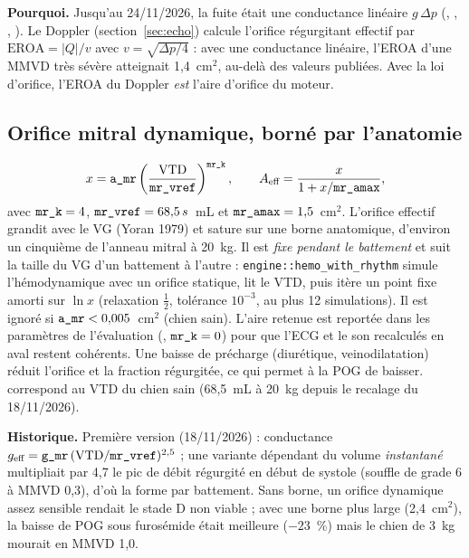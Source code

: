 \documentclass[10pt,a4paper]{article}
\newcommand{\cmd}[1]{\texttt{#1}}
\newcommand{\vp}[1]{\text{\texttt{\detokenize{#1}}}}
\begin{document}
\textbf{Pourquoi.} Jusqu'au 24/11/2026, la fuite était une conductance linéaire $g\,\Delta p$ (\vp{g_mr}, \vp{g_ar}, \vp{g_tr}, \vp{g_pr}). Le Doppler (section~\ref{sec:echo}) calcule l'orifice régurgitant effectif par $\text{EROA} = |Q|/v$ avec $v = \sqrt{\Delta p/4}$ : avec une conductance linéaire, l'EROA d'une MMVD très sévère atteignait 1,4~cm$^2$, au-delà des valeurs publiées. Avec la loi d'orifice, l'EROA du Doppler \emph{est} l'aire d'orifice du moteur.

\subsection{Orifice mitral dynamique, borné par l'anatomie}
\begin{equation}
x = \vp{a_mr}\left(\frac{\text{VTD}}{\vp{mr_vref}}\right)^{\vp{mr_k}}, \qquad
A_\text{eff} = \frac{x}{1 + x/\vp{mr_amax}},
\end{equation}
avec $\vp{mr_k} = 4$, $\vp{mr_vref} = 68{,}5\,s$~mL et $\vp{mr_amax} = 1{,}5$~cm$^2$.
L'orifice effectif grandit avec le VG (Yoran 1979) et sature sur une borne anatomique, d'environ un cinquième de l'anneau mitral à 20~kg. Il est \emph{fixe pendant le battement} et suit la taille du VG d'un battement à l'autre : \cmd{engine::hemo\_with\_rhythm} simule l'hémodynamique avec un orifice statique, lit le VTD, puis itère un point fixe amorti sur $\ln x$ (relaxation $\tfrac12$, tolérance $10^{-3}$, au plus 12 simulations). Il est ignoré si $\vp{a_mr} < 0{,}005$~cm$^2$ (chien sain). L'aire retenue est reportée dans les paramètres de l'évaluation (\vp{a_mr}, $\vp{mr_k} = 0$) pour que l'ECG et le son recalculés en aval restent cohérents. Une baisse de précharge (diurétique, veinodilatation) réduit l'orifice et la fraction régurgitée, ce qui permet à la POG de baisser. \vp{mr_vref} correspond au VTD du chien sain (68,5~mL à 20~kg depuis le recalage du 18/11/2026).

\textbf{Historique.} Première version (18/11/2026) : conductance $g_\text{eff} = \vp{g_mr}\,(\text{VTD}/\vp{mr_vref})^{2{,}5}$ ; une variante dépendant du volume \emph{instantané} multipliait par 4,7 le pic de débit régurgité en début de systole (souffle de grade 6 à MMVD 0,3), d'où la forme par battement. Sans borne, un orifice dynamique assez sensible rendait le stade D non viable ; avec une borne plus large (2,4~cm$^2$), la baisse de POG sous furosémide était meilleure ($-23$~\%) mais le chien de 3~kg mourait en MMVD 1,0.
\end{document}
